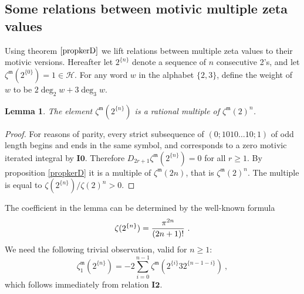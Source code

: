 \documentclass[10pt]{amsart}
\newtheorem{lem}[thm]{Lemma}
\theoremstyle{definition}
\theoremstyle{remark}
\numberwithin{equation}{section}
\newcommand{\Ho}{\mathcal{H}}
\newcommand{\Io}{\mathbf{I0}}
\newcommand{\Iii}{\mathbf{I2}}
\newcommand{\zetam}{\zeta^{ \mathfrak{m}}}
\begin{document}
\subsection{Some relations between motivic multiple zeta values}  Using theorem $\ref{propkerD}$ we lift relations between multiple zeta values to their 
motivic versions. Hereafter let 
$2^{\{n\}}$ denote a sequence of $n$ consecutive 2's, and let $\zetam(2^{\{0\}})=1\in \Ho$. For any word $w$ in the alphabet $\{2,3\}$, define the weight of $w$ to be $2 \deg_2 w + 3 \deg_3 w$.
\begin{lem} \label{lemlev0}  The element  $\zetam(2^{\{n\}})$ is a rational multiple of $\zetam(2)^n$. 
\end{lem}
\begin{proof} For reasons of parity, every  strict subsequence of $(0;1010\ldots 10;1)$ of odd length begins and ends in the same symbol, and   corresponds to a zero motivic iterated integral by  $\Io$. Therefore
$D_{2r+1} \zetam(2^{\{n\}})=0$ for all $r\geq 1$. By proposition \ref{propkerD} it  is  a multiple of $\zetam(2n)$, that is $\zetam(2)^n$.
The multiple  is equal to $\zeta(2^{\{n\}})/\zeta(2)^n>0$.
\end{proof} 
The coefficient in the lemma can be  determined by the well-known  formula  
\begin{equation} \label{zeta222}
\zeta(2^{\{n\}}) = { \pi^{2n} \over  (2n+1)!}\ .
\end{equation}
 We need the following trivial observation, valid for $n\geq 1$:
\begin{equation} \label{12nshuffle} 
\zetam_1(2^{\{n\}}) =  -2 \sum_{i=0}^{n-1} \zetam(2^{\{i\}}32^{\{n-1-i\}})\ , 
\end{equation} 
which  follows immediately from  relation $\Iii$.
\end{document}
